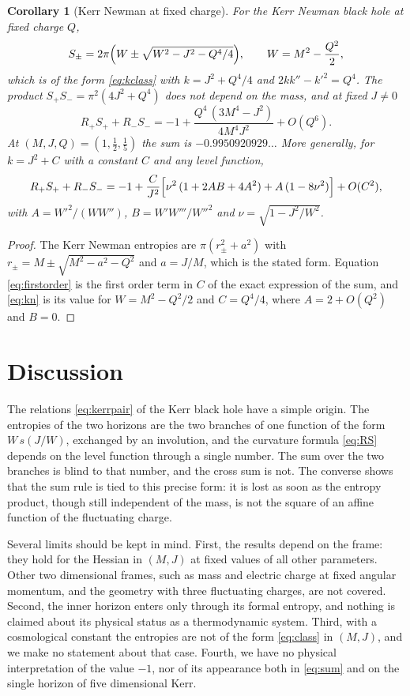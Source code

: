 \documentclass[11pt]{article}
\newtheorem{corollary}{Corollary}
\theoremstyle{definition}
\theoremstyle{remark}
\begin{document}
\begin{corollary}[Kerr Newman at fixed charge]\label{cor:kn}
For the Kerr Newman black hole at fixed charge $Q$,
\[
S_{\pm}=2\pi\Bigl(W\pm\sqrt{W^{2}-J^{2}-Q^{4}/4}\Bigr),\qquad W=M^{2}-\frac{Q^{2}}{2},
\]
which is of the form \eqref{eq:kclass} with $k=J^{2}+Q^{4}/4$ and $2kk''-k'^{2}=Q^{4}$. The product $S_{+}S_{-}=\pi^{2}(4J^{2}+Q^{4})$ does not depend on the mass, and at fixed $J\neq0$
\begin{equation}\label{eq:kn}
R_{+}S_{+}+R_{-}S_{-}=-1+\frac{Q^{4}\,(3M^{4}-J^{2})}{4M^{4}J^{2}}+O(Q^{6}) .
\end{equation}
At $(M,J,Q)=(1,\tfrac12,\tfrac15)$ the sum is $-0.9950920929\ldots$
More generally, for $k=J^{2}+C$ with a constant $C$ and any level function,
\begin{equation}\label{eq:firstorder}
R_{+}S_{+}+R_{-}S_{-}=-1+\frac{C}{J^{2}}\Bigl[\nu^{2}\,(1+2AB+4A^{2})+A\,(1-8\nu^{2})\Bigr]+O(C^{2}),
\end{equation}
with $A=W'^{2}/(WW'')$, $B=W'W'''/W''^{2}$ and $\nu=\sqrt{1-J^{2}/W^{2}}$.
\end{corollary}

\begin{proof}
The Kerr Newman entropies are $\pi(r_{\pm}^{2}+a^{2})$ with $r_{\pm}=M\pm\sqrt{M^{2}-a^{2}-Q^{2}}$ and $a=J/M$, which is the stated form. Equation \eqref{eq:firstorder} is the first order term in $C$ of the exact expression of the sum, and \eqref{eq:kn} is its value for $W=M^{2}-Q^{2}/2$ and $C=Q^{4}/4$, where $A=2+O(Q^{2})$ and $B=0$.
\end{proof}

\section{Discussion}\label{sec:disc}

The relations \eqref{eq:kerrpair} of the Kerr black hole have a simple origin. The entropies of the two horizons are the two branches of one function of the form $W\,s(J/W)$, exchanged by an involution, and the curvature formula \eqref{eq:RS} depends on the level function through a single number. The sum over the two branches is blind to that number, and the cross sum is not. The converse shows that the sum rule is tied to this precise form: it is lost as soon as the entropy product, though still independent of the mass, is not the square of an affine function of the fluctuating charge.

Several limits should be kept in mind. First, the results depend on the frame: they hold for the Hessian in $(M,J)$ at fixed values of all other parameters. Other two dimensional frames, such as mass and electric charge at fixed angular momentum, and the geometry with three fluctuating charges, are not covered. Second, the inner horizon enters only through its formal entropy, and nothing is claimed about its physical status as a thermodynamic system. Third, with a cosmological constant the entropies are not of the form \eqref{eq:class} in $(M,J)$, and we make no statement about that case. Fourth, we have no physical interpretation of the value $-1$, nor of its appearance both in \eqref{eq:sum} and on the single horizon of five dimensional Kerr.
\end{document}
